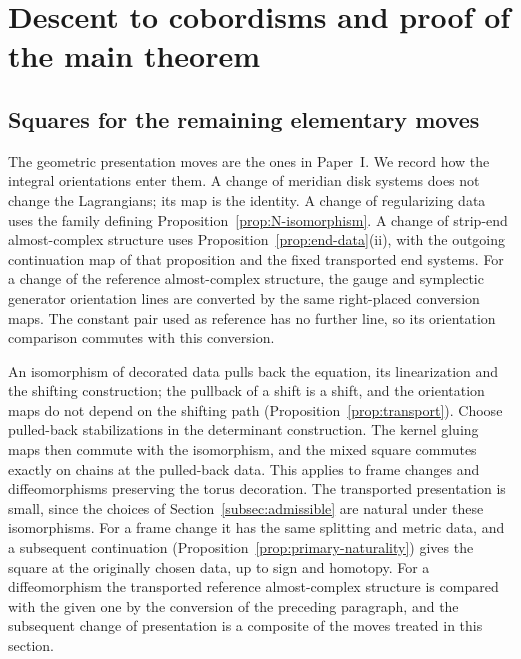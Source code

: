 \documentclass[11pt]{amsart}
\theoremstyle{definition}
\theoremstyle{remark}
\theoremstyle{plain}
\numberwithin{equation}{section}
\begin{document}
\section{Descent to cobordisms and proof of the main theorem}
\label{sec:descent}

\subsection{Squares for the remaining elementary moves}
The geometric presentation moves are the
ones in Paper~I. We record how the
integral orientations enter them. A change
of meridian disk systems does not change
the Lagrangians; its map is the identity.
A change of regularizing data uses
the family defining
Proposition~\ref{prop:N-isomorphism}.
A change of strip-end almost-complex
structure uses Proposition~\ref{prop:end-data}(ii),
with the outgoing continuation map of that
proposition and the fixed transported end systems.
For a change of the reference almost-complex
structure, the gauge and symplectic generator
orientation lines are converted by the same
right-placed conversion maps. The constant pair used as
reference has no further line, so its orientation
comparison commutes with this conversion.

An isomorphism of decorated data
pulls back the equation, its
linearization and the shifting
construction; the pullback of a
shift is a shift, and the
orientation maps do not depend on
the shifting path
(Proposition~\ref{prop:transport}). Choose pulled-back
stabilizations in the determinant
construction. The kernel gluing
maps then commute with the
isomorphism, and the mixed square
commutes exactly on chains at the
pulled-back data. This applies
to frame changes and diffeomorphisms
preserving the torus decoration. The
transported presentation is small,
since the choices of
Section~\ref{subsec:admissible} are natural
under these isomorphisms. For a frame
change it has the same splitting and metric
data, and a subsequent continuation
(Proposition~\ref{prop:primary-naturality})
gives the square at the originally chosen
data, up to sign and homotopy. For a
diffeomorphism the transported reference
almost-complex structure is compared with the
given one by the conversion of the preceding
paragraph, and the
subsequent change of presentation is a
composite of the moves treated in this
section.
\end{document}
